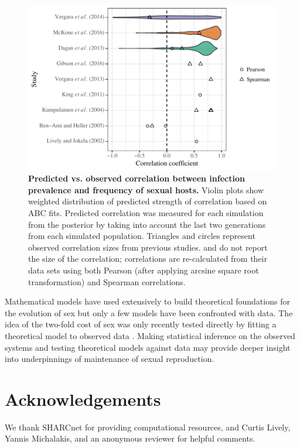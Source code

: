 \documentclass{article}\usepackage[]{graphicx}\usepackage[]{color}
\begin{document}
\begin{figure}[!ht]
\includegraphics[width=\textwidth]{../fig/effect_size.pdf}
\caption{{\bf Predicted vs. observed correlation between infection prevalence and frequency of sexual hosts.}
Violin plots show weighted distribution of predicted strength of correlation based on ABC fits.
Predicted correlation was measured for each simulation from the posterior by taking into account the last two generations from each simulated population.
Triangles and circles represent observed correlation sizes from previous studies.
\cite{dagan2013clonal} and \cite{vergara2014infection} do not report the size of the correlation; correlations are re-calculated from their data sets using both Pearson (after applying arcsine square root transformation) and Spearman correlations.
}
\label{fig:effect}
\end{figure}

Mathematical models have used extensively to build theoretical foundations for the evolution of sex but only a few models have been confronted with data.
The idea of the two-fold cost of sex was only recently tested directly by fitting a theoretical model to observed data \citep{gibson2017two}.
Making statistical inference on the observed systems and testing theoretical models against data may provide deeper insight into underpinnings of maintenance of sexual reproduction.

\section{Acknowledgements}

We thank SHARCnet for providing computational resources, and Curtis Lively, Yannis Michalakis, and an anonymous reviewer for helpful comments. 
\end{document}

